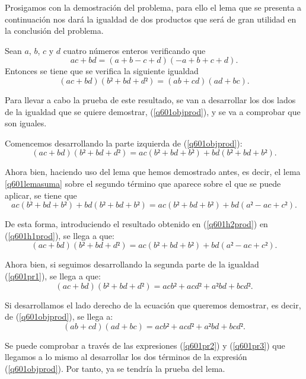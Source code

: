 Prosigamos con la demostración del problema, para ello el lema que se
presenta a continuación nos dará la igualdad de dos productos que será
de gran utilidad en la conclusión del problema.

\begin{lema}\label{q601lemaprod}
    Sean \(a\), \(b\), \(c\) y \(d\) cuatro números enteros verificando que 
    \begin{equation}\label{q601hipprod}\tag{h}
      ac+bd = (a+b-c+d)(-a+b+c+d).
    \end{equation}
    Entonces se tiene que se verifica la siguiente igualdad
    \begin{equation}\label{q601objprod}
      (ac+bd)(b²+bd+d²)=(ab+cd)(ad+bc).
    \end{equation}
\end{lema}

\begin{demostracion}
  Para llevar a cabo la prueba de este resultado, se van a desarrollar los
  dos lados de la igualdad que se quiere demostrar, (\ref{q601objprod}),
  y se va a comprobar que son iguales.

  Comencemos desarrollando la parte izquierda de (\ref{q601objprod}):
  \begin{equation}\label{q601h1prod}\tag{h1}
    (ac+bd)(b²+bd+d²)=ac(b²+bd+b²)+bd(b²+bd+b²).
  \end{equation}

  Ahora bien, haciendo uso del lema que hemos demostrado antes, es decir,
  el lema \ref{q601lemasuma} sobre el segundo término que aparece sobre
  el que se puede aplicar, se tiene que
  \begin{equation}\label{q601h2prod}\tag{h2}
    ac(b²+bd+b²)+bd(b²+bd+b²)=ac(b²+bd+b²)+bd(a²-ac+c²).
  \end{equation}

  De esta forma, introduciendo el resultado obtenido en (\ref{q601h2prod})
  en (\ref{q601h1prod}), se llega a que:
  \begin{equation}\label{q601pr1}
     (ac+bd)(b²+bd+d²)=ac(b²+bd+b²)+bd(a²-ac+c²).
  \end{equation}

  Ahora bien, si seguimos desarrollando la segunda parte de la igualdad
  (\ref{q601pr1}), se llega a que:
  \begin{equation}\label{q601pr2}
     (ac+bd)(b²+bd+d²)= acb²+acd²+a²bd+bcd².
  \end{equation}

   Si desarrollamos el lado derecho de la ecuación que queremos demostrar,
   es decir, de (\ref{q601objprod}), se llega a:
   \begin{equation}\label{q601pr3}
     (ab+cd)(ad+bc)= acb²+acd²+a²bd+bcd².
   \end{equation}

   Se puede comprobar a través de las expresiones (\ref{q601pr2}) y
   (\ref{q601pr3}) que llegamos a lo mismo al desarrollar los dos términos
   de la expresión (\ref{q601objprod}). Por tanto, ya se tendría la
   prueba del lema.
\end{demostracion}

